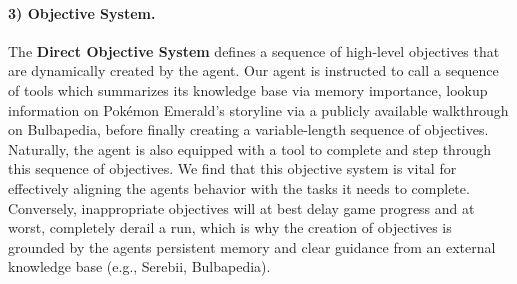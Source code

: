\documentclass[11pt]{article}
\begin{document}
\paragraph{3) Objective System. }

The \textbf{Direct Objective System}  defines a sequence of high-level objectives that are dynamically created by the agent. Our agent is instructed to call a sequence of tools which summarizes its knowledge base via memory importance, lookup information on Pokémon Emerald’s storyline via a publicly available walkthrough on Bulbapedia, before finally creating a variable-length sequence of objectives.  Naturally, the agent is also equipped with a tool to complete and step through this sequence of objectives. We find that this objective system is vital for effectively aligning the agents behavior with the tasks it needs to complete. Conversely, inappropriate objectives will at best delay game progress and at worst, completely derail a run, which is why the creation of objectives is grounded by the agents persistent memory and clear guidance from an external knowledge base (e.g., Serebii, Bulbapedia).







    





\end{document}

